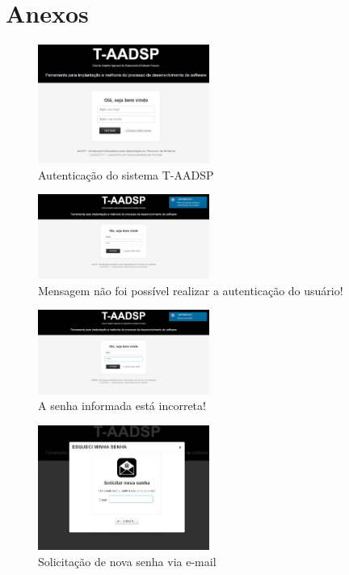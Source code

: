 \documentclass{acm_proc_article-sp}
\begin{document}



\section{Anexos}

\begin{figure}[h]
\centering %
\includegraphics[width=0.5\textwidth]{RF_autenticacao.jpg} %
\caption{Autenticação do sistema T-AADSP}
\end{figure}

\begin{figure}[h]
\centering %
\includegraphics[width=0.5\textwidth]{RF_autenticacao_dados_incorretos.jpg} %
\caption{Mensagem não foi possível realizar a autenticação do usuário! }
\end{figure}

\begin{figure}[h]
\centering %
\includegraphics[width=0.5\textwidth]{RF_autenticacao_senha_incorreta.jpg} %
\caption{A senha informada está incorreta! }
\end{figure}

\begin{figure}[h]
\centering %
\includegraphics[width=0.5\textwidth]{RF_autenticacao_solicitar_nova_senha.jpg} %
\caption{Solicitação de nova senha via e-mail }
\end{figure}
\end{document}

